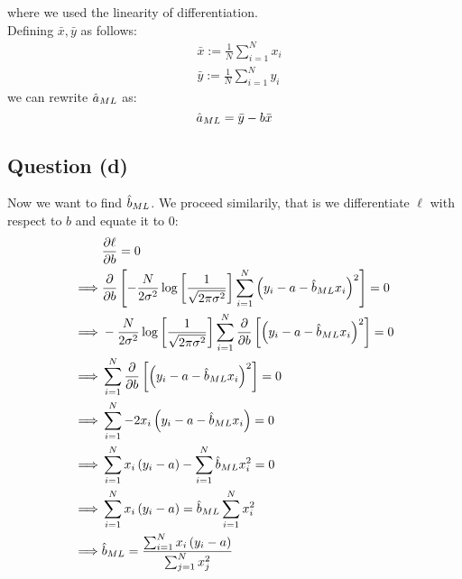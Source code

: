 \documentclass[12pt]{article}
\begin{document}
where we used the linearity of differentiation. \\
Defining \(\bar{x}, \bar{y}\) as follows:
\begin{align*}
     & \bar{x} := \frac{1}{N} \sum_{i=1}^N x_i \\
     & \bar{y} := \frac{1}{N} \sum_{i=1}^N y_i
\end{align*}
we can rewrite \(\hat a_{ML}\) as:
\begin{equation}
    \label{eqn: preliminary aml}
    \hat a_{ML} = \bar{y} - b \bar{x}
\end{equation}
\subsection{Question (d)}
Now we want to find \(\hat b_{ML}\). We proceed similarily, that is we differentiate \(\ell\) with respect to \(b\) and equate it to 0:
\begin{align*}
             &
    \frac{\partial \ell}{\partial b} = 0                                                                                                                                     \\
    \implies &
    \frac{\partial}{\partial b} \left[-\frac{N}{2 \sigma^2}\log \left[\frac{1}{\sqrt{2 \pi \sigma^{2}}}\right] \sum_{i=1}^N \left(y_i - a - \hat b_{ML} x_i \right)^{2}\right] = 0  \\
    \implies &
    -\frac{N}{2 \sigma^2}\log \left[\frac{1}{\sqrt{2 \pi \sigma^{2}}}\right] \sum_{i=1}^N \frac{\partial}{\partial b} \left[ \left(y_i - a - \hat b_{ML} x_i \right)^{2}\right] = 0 \\
    \implies &
    \sum_{i=1}^N \frac{\partial}{\partial b} \left[ \left(y_i - a - \hat b_{ML} x_i \right)^{2}\right] = 0                                                                          \\
    \implies &
    \sum_{i=1}^N -2x_i \left(y_i - a - \hat b_{ML} x_i \right) = 0                                                                                                                  \\
    \implies &
    \sum_{i=1}^N x_i \left(y_i - a \right) - \sum_{i=1}^N \hat b_{ML} x_i^2 = 0                                                                                                     \\
    \implies &
    \sum_{i=1}^N x_i \left(y_i - a \right) = \hat b_{ML} \sum_{i=1}^N x_i^2                                                                                                         \\
    \implies &
    \hat b_{ML} = \frac{\sum_{i=1}^N x_i \left(y_i - a \right)}{\sum_{j=1}^N x_j^2}                                                                                                 \\
\end{align*}
\end{document}
